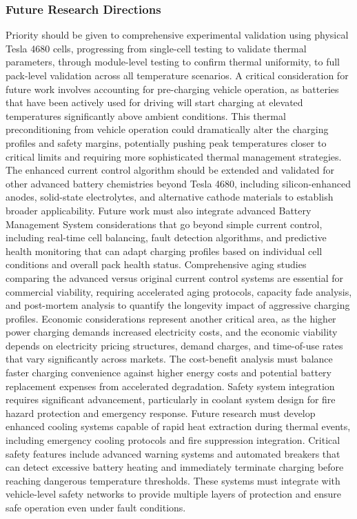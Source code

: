 \documentclass[conference]{IEEEtran}
\begin{document}
\subsubsection{Future  Research Directions}
Priority should be given to comprehensive experimental validation using physical Tesla 4680 cells, progressing from single-cell testing to validate thermal parameters, through module-level testing to confirm thermal uniformity, to full pack-level validation across all temperature scenarios. A critical consideration for future work involves accounting for pre-charging vehicle operation, as batteries that have been actively used for driving will start charging at elevated temperatures significantly above ambient conditions. This thermal preconditioning from vehicle operation could dramatically alter the charging profiles and safety margins, potentially pushing peak temperatures closer to critical limits and requiring more sophisticated thermal management strategies.
The enhanced current control algorithm should be extended and validated for other advanced battery chemistries beyond Tesla 4680, including silicon-enhanced anodes, solid-state electrolytes, and alternative cathode materials to establish broader applicability. Future work must also integrate advanced Battery Management System considerations that go beyond simple current control, including real-time cell balancing, fault detection algorithms, and predictive health monitoring that can adapt charging profiles based on individual cell conditions and overall pack health status.
Comprehensive aging studies comparing the advanced versus original current control systems are essential for commercial viability, requiring accelerated aging protocols, capacity fade analysis, and post-mortem analysis to quantify the longevity impact of aggressive charging profiles. Economic considerations represent another critical area, as the higher power charging demands increased electricity costs, and the economic viability depends on electricity pricing structures, demand charges, and time-of-use rates that vary significantly across markets. The cost-benefit analysis must balance faster charging convenience against higher energy costs and potential battery replacement expenses from accelerated degradation.
Safety system integration requires significant advancement, particularly in coolant system design for fire hazard protection and emergency response. Future research must develop enhanced cooling systems capable of rapid heat extraction during thermal events, including emergency cooling protocols and fire suppression integration. Critical safety features include advanced warning systems and automated breakers that can detect excessive battery heating and immediately terminate charging before reaching dangerous temperature thresholds. These systems must integrate with vehicle-level safety networks to provide multiple layers of protection and ensure safe operation even under fault conditions.
\end{document}

